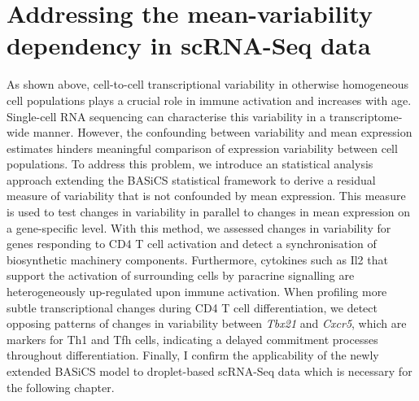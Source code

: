 
\chapter{Addressing the mean-variability dependency in scRNA-Seq data}  

\graphicspath{{Chapter2/Figures/}}

\vfill

\begin{Abstract}
As shown above, cell-to-cell transcriptional variability in otherwise homogeneous cell populations plays a crucial role in immune activation and increases with age. Single-cell RNA sequencing can characterise this variability in a transcriptome-wide manner. However, the confounding between variability and mean expression estimates hinders meaningful comparison of expression variability between cell populations. To address this problem, we introduce an statistical analysis approach extending the BASiCS statistical framework to derive a residual measure of variability that is not confounded by mean expression. This measure is used to test changes in variability in parallel to changes in mean expression on a gene-specific level. With this method, we assessed changes in variability for genes responding to CD4\plus{} T cell activation and detect a synchronisation of biosynthetic machinery components. Furthermore, cytokines such as Il2 that support the activation of surrounding cells by paracrine signalling are heterogeneously up-regulated upon immune activation. When profiling more subtle transcriptional changes during CD4\plus{} T cell differentiation, we detect opposing patterns of changes in variability between \textit{Tbx21} and \textit{Cxcr5}, which are markers for Th1 and Tfh cells, indicating a delayed commitment processes throughout differentiation. Finally, I confirm the applicability of the newly extended BASiCS model to droplet-based scRNA-Seq data which is necessary for the following chapter.
\end{Abstract}

\vfill

\newpage

\vspace*{\fill}

